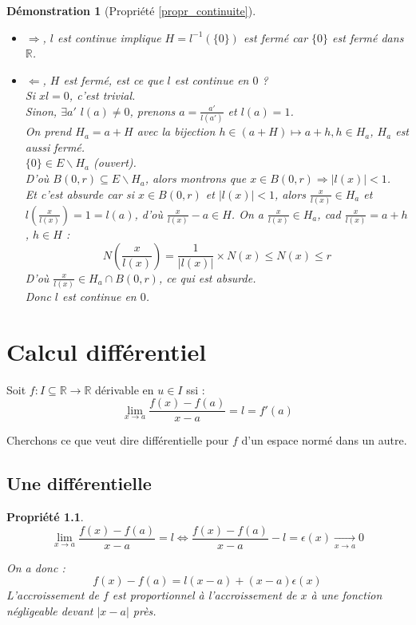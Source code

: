 \documentclass[a4paper, oneside]{report}
\theoremstyle{break}
\newtheorem{propr}[thm]{Propriété}
\newtheorem*{demo}{Démonstration}
\newcommand{\x}{\times}
\newcommand{\R}{\mathbb{R}}
\newcommand{\fracun}[1]{\frac{1}{#1}}
\begin{document}
\begin{demo}[Propriété \ref{propr_continuite}]
\begin{itemize}
\item $\Rightarrow$, $l$ est continue implique $H=l^{-1}(\{0\})$ est fermé car $\{0\}$ est fermé dans $\R$.
\item $\Leftarrow$, $H$ est fermé, est ce que $l$ est continue en $0$ ?\\
Si $xl=0$, c'est trivial.\\
Sinon, $\exists a'$ $l(a)\neq 0$, prenons $a=\frac{a'}{l(a')}$ et $l(a)=1$.\\
On prend $H_a = a+H$ avec la bijection $h\in (a+H) \mapsto a+ h, h\in H_a$, $H_a$ est aussi fermé.\\
$\{0\}\in E\backslash H_a$ (ouvert).\\
D'où $B(0,r)\subseteq E\backslash H_a$, alors montrons que $x\in B(0,r)\Rightarrow |l(x)|<1$.\\
Et c'est absurde car si $x\in B(0,r)$ et $|l(x)|<1$, alors $\frac{x}{l(x)}\in H_a$ et $l(\frac{x}{l(x)})=1=l(a)$, d'où $\frac{x}{l(x)}-a\in H$.
On a $\frac{x}{l(x)}\in H_a$, cad $\frac{x}{l(x)}=a+h$, $h\in H$ :
$$N(\frac{x}{l(x)})=\fracun{|l(x)|}\x N(x)\leq N(x)\leq r$$
D'où $\frac{x}{l(x)}\in H_a \cap B(0,r)$, ce qui est absurde.\\
Donc $l$ est continue en $0$.
\end{itemize}
\end{demo}

\chapter{Calcul différentiel}

Soit $f:I\subseteq \R \rightarrow \R$ dérivable en $u\in I$ ssi :
$$\lim\limits_{x\rightarrow a}\frac{f(x)-f(a)}{x-a}=l=f'(a)$$

Cherchons ce que veut dire différentielle pour $f$ d'un espace normé dans un autre.

\section{Une différentielle}

\begin{propr}
$$\lim\limits_{x \rightarrow a}\frac{f(x)-f(a)}{x-a}=l \Leftrightarrow \frac{f(x)-f(a)}{x-a}-l=\epsilon(x)\underset{x\rightarrow a}{\rightarrow} 0$$

On a donc :
$$f(x)-f(a)=l(x-a)+(x-a)\epsilon(x)$$
L'accroissement de $f$ est proportionnel à l'accroissement de $x$ à une fonction négligeable devant $|x-a|$ près.
\end{propr}
\end{document}
